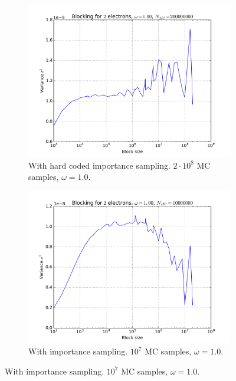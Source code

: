 \documentclass[11pt]{article}
\begin{document}
\begin{figure}[H]
    \centering
    \begin{subfigure}[t]{0.45\textwidth}
        \centering
        \includegraphics[width=1.0\linewidth]{../figures/figures_to_use/electron2_omega1_beta1.png} 
        \caption{With hard coded importance sampling. $2\cdot10^8$ MC samples, $\omega=1.0$.}
        \label{fig:blocking-2e-imp-hc}
    \end{subfigure}
    \hfill
    \begin{subfigure}[t]{0.45\textwidth}
        \centering
        \includegraphics[width=1.0\linewidth]{../figures/figures_to_use/imp_electron2_omega1_beta1.png} 
        \caption{With importance sampling. $10^7$ MC samples, $\omega=1.0$.}

\end{subfigure}
\end{figure}
\end{document}
